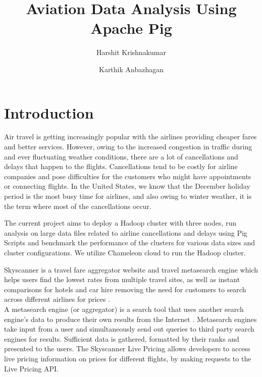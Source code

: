 \documentclass[9pt,twocolumn,twoside]{../../styles/osajnl}
\title{Aviation Data Analysis Using Apache Pig}
\author[1,*]{Harshit Krishnakumar}
\author[2]{Karthik Anbazhagan}
\affil[1]{School of Informatics and Computing, Bloomington, IN 47408, U.S.A.}
\affil[2]{School of Informatics and Computing, Bloomington, IN 47408, U.S.A.}
\affil[*]{Corresponding authors: harkrish@iu.edu, kartanba@iu.edu}
\begin{document}
\flushbottom %

\maketitle %

\tableofcontents %
\maketitle

\section{Introduction}
Air travel is getting increasingly popular with the airlines providing cheaper fares and better services. However, owing to the increased congestion in traffic during and ever fluctuating weather conditions, there are a lot of cancellations and delays that happen to the flights. Cancellations tend to be costly for airline companies and pose difficulties for the customers who might have appointments or connecting flights. In the United States, we know that the December holiday period is the most busy time for airlines, and also owing to winter weather, it is the term where most of the cancellations occur. 

The current project aims to deploy a Hadoop cluster with three nodes, run analysis on large data files related to airline cancellations and delays using Pig Scripts and benchmark the performance of the clusters for various data sizes and cluster configurations. We utilize Chameleon cloud to run the Hadoop cluster. 


Skyscanner is a travel fare aggregator website and travel metasearch engine which helps users find the lowest rates from multiple travel sites, as well as instant comparisons for hotels and car hire removing the need for customers to search across different airlines for prices \cite{paper-jansen}. \\

A metasearch engine (or aggregator) is a search tool that uses another search engine's data to produce their own results from the Internet \cite{book-sandy}. Metasearch \cite{conf-metasearch} engines take input from a user and simultaneously send out queries to third party search engines for results. Sufficient data is gathered, formatted by their ranks and presented to the users. The Skyscanner Live Pricing allows developers to access live pricing information on prices for different flights, by making requests to the Live Pricing API. \\
\end{document}
